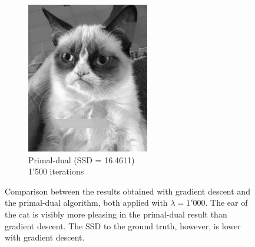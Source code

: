 \documentclass{paper}
\begin{document}
\begin{figure}[ht]
\begin{subfigure}[ht]{0.45\textwidth}
	\includegraphics[width=\textwidth]{result-cat-lambda1000-theta0_5-iter1500}
	\caption*{Primal-dual (SSD = 16.4611) \\1'500 iterations}
\end{subfigure}
\caption{Comparison between the results obtained with gradient descent and the primal-dual algorithm, both applied with $\lambda = 1'000$. The ear of the cat is visibly more pleasing in the primal-dual result than gradient descent. The SSD to the ground truth, however, is lower with gradient descent.}
\label{fig:grad-desc-vs-primal-dual}
\end{figure}


\nocite{*}


 
\end{document}
